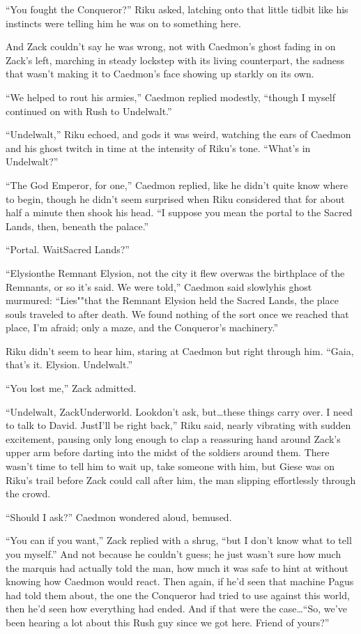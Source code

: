 ``You fought the Conqueror?'' Riku asked, latching onto that little tidbit like his instincts were telling him he was on to something here.

And Zack couldn't say he was wrong, not with Caedmon's ghost fading in on Zack's left, marching in steady lockstep with its living counterpart, the sadness that wasn't making it to Caedmon's face showing up starkly on its own.

``We helped to rout his armies,'' Caedmon replied modestly, ``though I myself continued on with Rush to Undelwalt.''

``Undelwalt,'' Riku echoed, and gods it was weird, watching the ears of Caedmon and his ghost twitch in time at the intensity of Riku's tone. ``What's in Undelwalt?''

``The God Emperor, for one,'' Caedmon replied, like he didn't quite know where to begin, though he didn't seem surprised when Riku considered that for about half a minute then shook his head. ``I suppose you mean the portal to the Sacred Lands, then, beneath the palace.''

``Portal. Wait\textemdash Sacred Lands?''

``Elysion\textemdash the Remnant Elysion, not the city it flew over\textemdash was the birthplace of the Remnants, or so it's said. We were told,'' Caedmon said slowly\textemdash his ghost murmured: ``Lies"\textemdash "that the Remnant Elysion held the Sacred Lands, the place souls traveled to after death. We found nothing of the sort once we reached that place, I'm afraid; only a maze, and the Conqueror's machinery.''

Riku didn't seem to hear him, staring at Caedmon but right through him. ``Gaia, that's it. Elysion. Undelwalt.''

``You lost me,'' Zack admitted.

``Undelwalt, Zack\textemdash Underworld. Look\textemdash don't ask, but\ldots these things carry over. I need to talk to David. Just\textemdash I'll be right back,'' Riku said, nearly vibrating with sudden excitement, pausing only long enough to clap a reassuring hand around Zack's upper arm before darting into the midst of the soldiers around them. There wasn't time to tell him to wait up, take someone with him, but Giese was on Riku's trail before Zack could call after him, the man slipping effortlessly through the crowd.

``Should I ask?'' Caedmon wondered aloud, bemused.

``You can if you want,'' Zack replied with a shrug, ``but I don't know what to tell you myself.'' And not because he couldn't guess; he just wasn't sure how much the marquis had actually told the man, how much it was safe to hint at without knowing how Caedmon would react. Then again, if he'd seen that machine Pagus had told them about, the one the Conqueror had tried to use against this world, then he'd seen how everything had ended. And if that were the case\ldots  ``So, we've been hearing a lot about this Rush guy since we got here. Friend of yours?''


